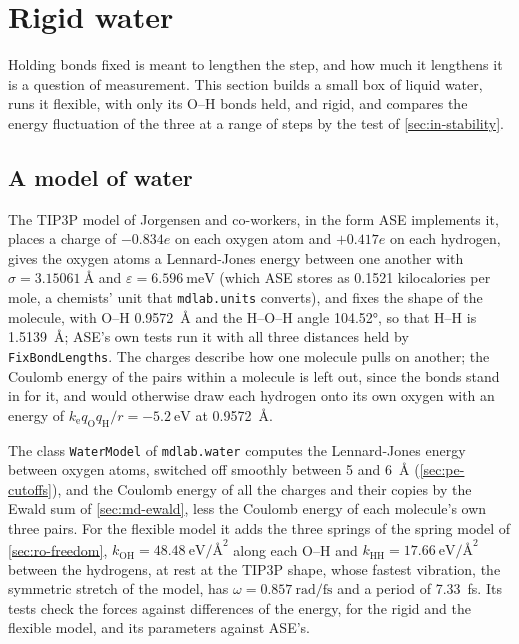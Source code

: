 \section{Rigid water}
\label{sec:cs-water}

Holding bonds fixed is meant to lengthen the step, and how much it
lengthens it is a question of measurement. This section builds a small
box of liquid water, runs it flexible, with only its O--H bonds held, and
rigid, and compares the energy fluctuation of the three at a range of
steps by the test of \cref{sec:in-stability}.

\subsection*{A model of water}

The TIP3P model of Jorgensen and co-workers\cite{Jorgensen1983}, in the
form ASE implements it\cite{Larsen2017}, places a charge of $-0.834e$ on
each oxygen atom and $+0.417e$ on each hydrogen, gives the oxygen atoms a
Lennard-Jones energy between one another with $\sigma =
\SI{3.15061}{\angstrom}$ and $\varepsilon = \SI{6.596}{\milli\electronvolt}$
(which ASE stores as 0.1521 kilocalories per mole, a chemists' unit that
\texttt{mdlab.units} converts), and fixes the shape of the
molecule, with O--H \SI{0.9572}{\angstrom} and the H--O--H angle
\ang{104.52}, so that H--H is \SI{1.5139}{\angstrom}; ASE's own tests run
it with all three distances held by \texttt{FixBondLengths}. The charges
describe how one molecule pulls on another; the Coulomb energy of the
pairs within a molecule is left out, since the bonds stand in for it, and
would otherwise draw each hydrogen onto its own oxygen with an energy of
$k_{\mathrm e}q_{\mathrm O}q_{\mathrm H}/r = \SI{-5.2}{\electronvolt}$ at
\SI{0.9572}{\angstrom}.

The class \texttt{WaterModel} of \texttt{mdlab.water} computes the
Lennard-Jones energy between oxygen atoms, switched off smoothly between
5 and \SI{6}{\angstrom} (\cref{sec:pe-cutoffs}), and the Coulomb energy
of all the charges and their copies by the Ewald sum of
\cref{sec:md-ewald}, less the Coulomb energy of each molecule's own three
pairs. For the flexible model it adds the three springs of the spring
model of \cref{sec:ro-freedom}, $k_{\mathrm{OH}} =
\SI{48.48}{\electronvolt\per\angstrom\squared}$ along each O--H and
$k_{\mathrm{HH}} = \SI{17.66}{\electronvolt\per\angstrom\squared}$
between the hydrogens, at rest at the TIP3P shape, whose fastest
vibration, the symmetric stretch of the model, has $\omega =
\SI{0.857}{\radian\per\femto\second}$ and a period of
\SI{7.33}{\femto\second}. Its tests check the forces against differences
of the energy, for the rigid and the flexible model, and its parameters
against ASE's.

